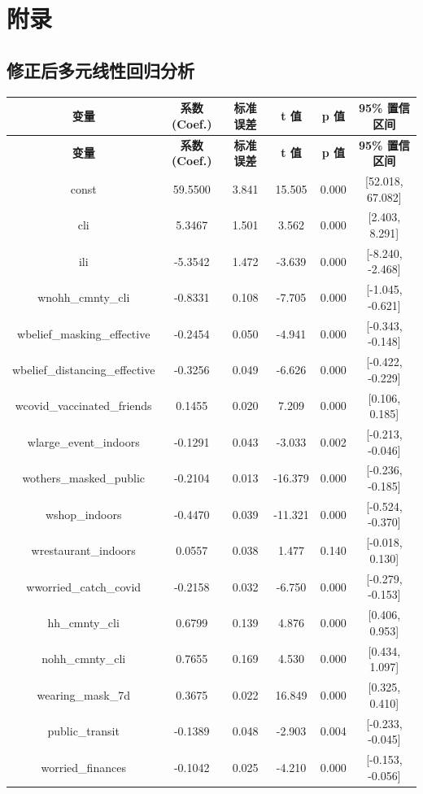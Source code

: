 \documentclass[UTF8,ctexart,a4paper,11pt,openany]{article}
\theoremstyle{definition}
\begin{document}
\section{附录}
\subsection{修正后多元线性回归分析}
\begin{longtable}{|c|c|c|c|c|c|}
\hline
\textbf{变量} & \textbf{系数 (Coef.)} & \textbf{标准误差} & \textbf{t 值} & \textbf{p 值} & \textbf{95\% 置信区间} \\
\hline
\endfirsthead
\hline
\textbf{变量} & \textbf{系数 (Coef.)} & \textbf{标准误差} & \textbf{t 值} & \textbf{p 值} & \textbf{95\% 置信区间} \\
\hline
\endhead
\hline
const & 59.5500 & 3.841 & 15.505 & 0.000 & [52.018, 67.082] \\
\hline
cli & 5.3467 & 1.501 & 3.562 & 0.000 & [2.403, 8.291] \\
\hline
ili & -5.3542 & 1.472 & -3.639 & 0.000 & [-8.240, -2.468] \\
\hline
wnohh\_cmnty\_cli & -0.8331 & 0.108 & -7.705 & 0.000 & [-1.045, -0.621] \\
\hline
wbelief\_masking\_effective & -0.2454 & 0.050 & -4.941 & 0.000 & [-0.343, -0.148] \\
\hline
wbelief\_distancing\_effective & -0.3256 & 0.049 & -6.626 & 0.000 & [-0.422, -0.229] \\
\hline
wcovid\_vaccinated\_friends & 0.1455 & 0.020 & 7.209 & 0.000 & [0.106, 0.185] \\
\hline
wlarge\_event\_indoors & -0.1291 & 0.043 & -3.033 & 0.002 & [-0.213, -0.046] \\
\hline
wothers\_masked\_public & -0.2104 & 0.013 & -16.379 & 0.000 & [-0.236, -0.185] \\
\hline
wshop\_indoors & -0.4470 & 0.039 & -11.321 & 0.000 & [-0.524, -0.370] \\
\hline
wrestaurant\_indoors & 0.0557 & 0.038 & 1.477 & 0.140 & [-0.018, 0.130] \\
\hline
wworried\_catch\_covid & -0.2158 & 0.032 & -6.750 & 0.000 & [-0.279, -0.153] \\
\hline
hh\_cmnty\_cli & 0.6799 & 0.139 & 4.876 & 0.000 & [0.406, 0.953] \\
\hline
nohh\_cmnty\_cli & 0.7655 & 0.169 & 4.530 & 0.000 & [0.434, 1.097] \\
\hline
wearing\_mask\_7d & 0.3675 & 0.022 & 16.849 & 0.000 & [0.325, 0.410] \\
\hline
public\_transit & -0.1389 & 0.048 & -2.903 & 0.004 & [-0.233, -0.045] \\
\hline
worried\_finances & -0.1042 & 0.025 & -4.210 & 0.000 & [-0.153, -0.056] \\
\hline
\end{longtable}
\end{document}
